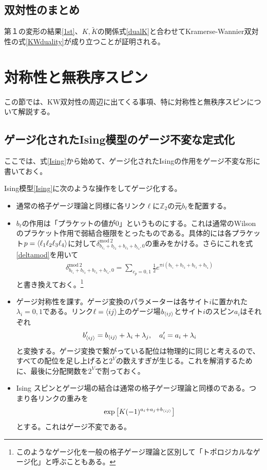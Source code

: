 \documentclass[a4paper,12pt,dvipdfmx]{jlreq}
\newcommand{\Zb}{\mathbb{Z}}
\newcommand{\Kt}{\widetilde{K}}
\newcommand{\deltamod}{\delta^{\mathrm{mod}\ 2}}
\begin{document}
\subsection{双対性のまとめ}

第１の変形の結果\eqref{1st}、$K,\Kt$の関係式\eqref{dualK}と合わせてKramerse-Wannier双対性の式\eqref{KWduality}が成り立つことが証明される。

\section{対称性と無秩序スピン}

この節では、KW双対性の周辺に出てくる事項、特に対称性と無秩序スピンについて解説する。

\subsection{ゲージ化されたIsing模型のゲージ不変な定式化}

ここでは、式\eqref{Ising}から始めて、ゲージ化されたIsingの作用をゲージ不変な形に書いておく。

Ising模型\eqref{Ising}に次のような操作をしてゲージ化する。
\begin{itemize}
  \item 通常の格子ゲージ理論と同様に各リンク$\ell$に$\Zb_2$の元$b_{\ell}$を配置する。
  \item $b_{\ell}$の作用は「プラケットの値が$0$」というものにする。これは通常のWilsonのプラケット作用で弱結合極限をとったものである。具体的には各プラケット$p=\expval{\ell_1 \ell_2 \ell_3 \ell_4}$に対して$\deltamod_{b_{\ell_1}+b_{\ell_2}+b_{\ell_3}+b_{\ell_4},0}$の重みをかける。さらにこれを式\eqref{deltamod}を用いて
  \begin{align}
    \deltamod_{b_{\ell_1}+b_{\ell_2}+b_{\ell_3}+b_{\ell_4},0}=\sum_{c_p=0,1}\frac{1}{2}e^{\pi i (b_{\ell_1}+b_{\ell_2}+b_{\ell_3}+b_{\ell_4})}
  \end{align}
  と書き換えておく。\footnote{このようなゲージ化を一般の格子ゲージ理論と区別して「トポロジカルなゲージ化」と呼ぶこともある。}
  \item ゲージ対称性を課す。ゲージ変換のパラメーターは各サイト$i$に置かれた$\lambda_i=0,1$である。リンク$\ell=\expval{ij}$上のゲージ場$b_{\expval{ij}}$とサイト$i$のスピン$a_{i}$はそれぞれ
  \begin{align}
    b_{\expval{ij}}'=b_{\expval{ij}}+\lambda_{i}+\lambda_{j},\quad
    a_{i}'=a_{i}+\lambda_{i}
    \label{gaugetransf}
  \end{align}
  と変換する。ゲージ変換で繋がっている配位は物理的に同じと考えるので、すべての配位を足し上げると$2^V$の数えすぎが生じる。これを解消するために、最後に分配関数を$2^{V}$で割っておく。
  \item Ising スピンとゲージ場の結合は通常の格子ゲージ理論と同様のである。つまり各リンクの重みを
  \begin{align}
    \exp\qty[K (-1)^{a_i+a_j+b_{\expval{ij}}}]
  \end{align}
  とする。これはゲージ不変である。
\end{itemize}
\end{document}
